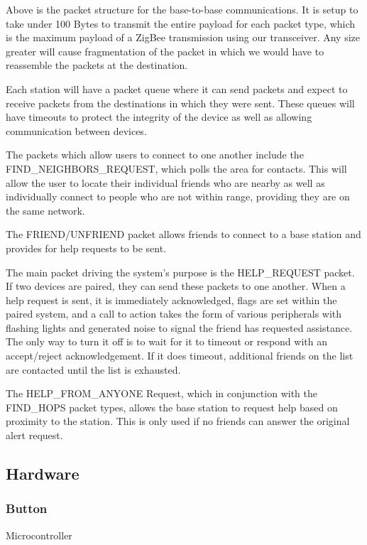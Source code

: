 \documentclass[journal]{IEEEtran}
\begin{document}
Above is the packet structure for the base-to-base communications.  It is setup to take under 100 Bytes to transmit the entire payload for each packet type, which is the maximum payload of a ZigBee transmission using our transceiver.  Any size greater will cause fragmentation of the packet in which we would have to reassemble the packets at the destination.

Each station will have a packet queue where it can send packets and expect to receive packets from the destinations in which they were sent.  These queues will have timeouts to protect the integrity of the device as well as allowing communication between devices.

The packets which allow users to connect to one another include the FIND\_NEIGHBORS\_REQUEST, which polls the area for contacts.  This will allow the user to locate their individual friends who are nearby as well as individually connect to people who are not within range, providing they are on the same network.

The FRIEND/UNFRIEND packet allows friends to connect to a base station and provides for help requests to be sent.

The main packet driving the system's purpose is the HELP\_REQUEST packet.  If two devices are paired, they can send these packets to one another.  When a help request is sent, it is immediately acknowledged, flags are set within the paired system, and a call to action takes the form of various peripherals with flashing lights and generated noise to signal the friend has requested assistance.  The only way to turn it off is to wait for it to timeout or respond with an accept/reject acknowledgement.  If it does timeout, additional friends on the list are contacted until the list is exhausted.

The HELP\_FROM\_ANYONE Request, which in conjunction with the FIND\_HOPS packet types, allows the base station to request help based on proximity to the station.  This is only used if no friends can answer the original alert request.

\subsection{Hardware}

\subsubsection{Button}

Microcontroller
\end{document}
